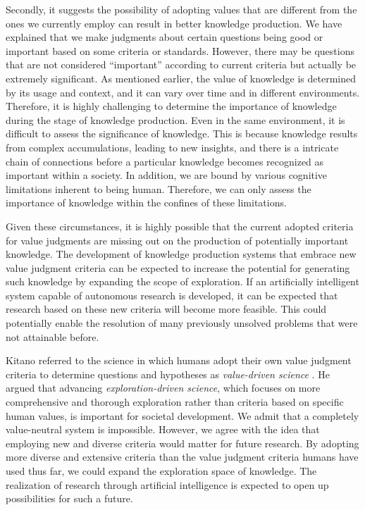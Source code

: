 
Secondly, it suggests the possibility of adopting values that are different from the ones we currently employ can result in better knowledge production. We have explained that we make judgments about certain questions being good or important based on some criteria or standards. However, there may be questions that are not considered ``important'' according to current criteria but actually be extremely significant. As mentioned earlier, the value of knowledge is determined by its usage and context, and it can vary over time and in different environments. Therefore, it is highly challenging to determine the importance of knowledge during the stage of knowledge production. Even in the same environment, it is difficult to assess the significance of knowledge. This is because knowledge results from complex accumulations, leading to new insights, and there is a intricate chain of connections before a particular knowledge becomes recognized as important within a society. In addition, we are bound by various cognitive limitations inherent to being human. Therefore, we can only assess the importance of knowledge within the confines of these limitations. 

Given these circumstances, it is highly possible that the current adopted criteria for value judgments are missing out on the production of potentially important knowledge. The development of knowledge production systems that embrace new value judgment criteria can be expected to increase the potential for generating such knowledge by expanding the scope of exploration. If an artificially intelligent system capable of autonomous research is developed, it can be expected that research based on these new criteria will become more feasible. This could potentially enable the resolution of many previously unsolved problems that were not attainable before.

Kitano referred to the science in which humans adopt their own value judgment criteria to determine questions and hypotheses as \textit{value-driven science} \cite{kitano2021nobel}. He argued that advancing \textit{exploration-driven science}, which focuses on more comprehensive and thorough exploration rather than criteria based on specific human values, is important for societal development. We admit that a completely value-neutral system is impossible. However, we agree with the idea that employing new and diverse criteria would matter for future research. By adopting more diverse and extensive criteria than the value judgment criteria humans have used thus far, we could expand the exploration space of knowledge. The realization of research through artificial intelligence is expected to open up possibilities for such a future.

